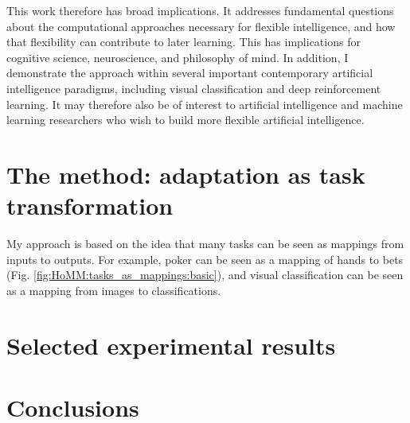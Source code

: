 \documentclass[11pt]{article}
\begin{document}
This work therefore has broad implications. It addresses fundamental questions about the computational approaches necessary for flexible intelligence, and how that flexibility can contribute to later learning. This has implications for cognitive science, neuroscience, and philosophy of mind. In addition, I demonstrate the approach within several important contemporary artificial intelligence paradigms, including visual classification and deep reinforcement learning. It may therefore also be of interest to artificial intelligence and machine learning researchers who wish to build more flexible artificial intelligence.

\section{The method: adaptation as task transformation}

My approach is based on the idea that many tasks can be seen as mappings from inputs to outputs. For example, poker can be seen as a mapping of hands to bets (Fig. \ref{fig:HoMM:tasks_as_mappings:basic}), and visual classification can be seen as a mapping from images to classifications.  


\section{Selected experimental results}

\section{Conclusions}



\end{document}
